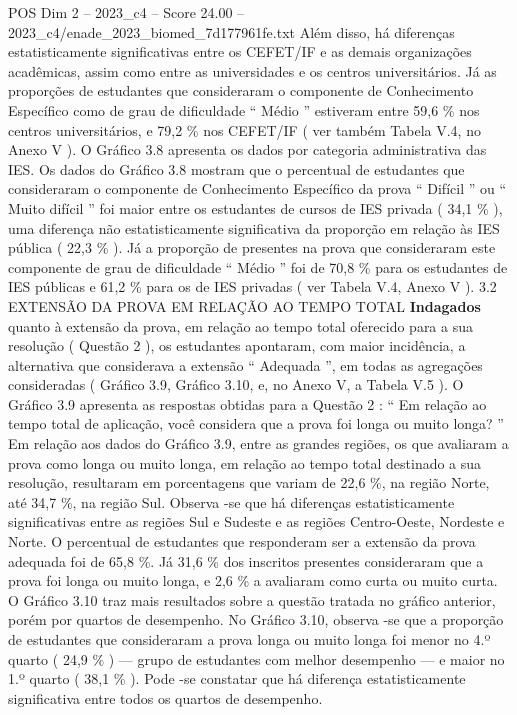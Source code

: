\begin{textsample}{POS Dim 2 – 2023\_c4 – Score 24.00 – 2023\_c4/enade\_2023\_biomed\_7d177961fe.txt}
Além disso, há diferenças estatisticamente significativas entre os CEFET/IF e as demais organizações acadêmicas, assim como entre as universidades e os centros universitários.
Já as proporções de estudantes que consideraram o componente de Conhecimento Específico como de grau de dificuldade “ Médio ” estiveram entre 59,6 \% nos centros universitários, e 79,2 \% nos CEFET/IF ( ver também Tabela V.4, no Anexo V ).
O Gráfico 3.8 apresenta os dados por categoria administrativa das IES.
Os dados do Gráfico 3.8 mostram que o percentual de estudantes que consideraram o componente de Conhecimento Específico da prova “ Difícil ” ou “ Muito difícil ” foi maior entre os estudantes de cursos de IES privada ( 34,1 \% ), uma diferença não estatisticamente significativa da proporção em relação às IES pública ( 22,3 \% ).
Já a proporção de presentes na prova que consideraram este componente de grau de dificuldade “ Médio ” foi de 70,8 \% para os estudantes de IES públicas e 61,2 \% para os de IES privadas ( ver Tabela V.4, Anexo V ). 3.2 EXTENSÃO DA PROVA EM RELAÇÃO AO TEMPO TOTAL \textbf{Indagados} quanto à extensão da prova, em relação ao tempo total oferecido para a sua resolução ( Questão 2 ), os estudantes apontaram, com maior incidência, a alternativa que considerava a extensão “ Adequada ”, em todas as agregações consideradas ( Gráfico 3.9, Gráfico 3.10, e, no Anexo V, a Tabela V.5 ).
O Gráfico 3.9 apresenta as respostas obtidas para a Questão 2 : “ Em relação ao tempo total de aplicação, você considera que a prova foi longa ou muito longa? ” Em relação aos dados do Gráfico 3.9, entre as grandes regiões, os que avaliaram a prova como longa ou muito longa, em relação ao tempo total destinado a sua resolução, resultaram em porcentagens que variam de 22,6 \%, na região Norte, até 34,7 \%, na região Sul.
Observa -se que há diferenças estatisticamente significativas entre as regiões Sul e Sudeste e as regiões Centro-Oeste, Nordeste e Norte.
O percentual de estudantes que responderam ser a extensão da prova adequada foi de 65,8 \%.
Já 31,6 \% dos inscritos presentes consideraram que a prova foi longa ou muito longa, e 2,6 \% a avaliaram como curta ou muito curta.
O Gráfico 3.10 traz mais resultados sobre a questão tratada no gráfico anterior, porém por quartos de desempenho.
No Gráfico 3.10, observa -se que a proporção de estudantes que consideraram a prova longa ou muito longa foi menor no 4.º quarto ( 24,9 \% ) — grupo de estudantes com melhor desempenho — e maior no 1.º quarto ( 38,1 \% ).
Pode -se constatar que há diferença estatisticamente significativa entre todos os quartos de desempenho.

\end{textsample}
